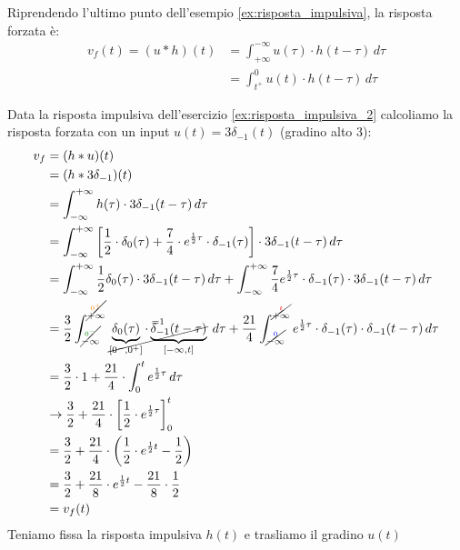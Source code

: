 \documentclass[a4paper]{article}
\begin{document}
\begin{example}
  Riprendendo l'ultimo punto dell'esempio \ref{ex:risposta_impulsiva}, la risposta
  forzata è:
  \[
    \begin{aligned}
      v_f(t) = (u \ast h)(t) &= \int_{+\infty}^{-\infty} u(\tau) \cdot h(t-\tau) \, d\tau\\
                             &= \int_{t^+}^{0} u(t) \cdot h(t-\tau) \, d\tau
    \end{aligned}
  \] 
\end{example}

\begin{exercise}
  \label{ex:risposta_forzata}
  Data la risposta impulsiva dell'esercizio \ref{ex:risposta_impulsiva_2} calcoliamo la
  risposta forzata con un input \( u(t) = 3\delta_{-1}(t) \) (gradino alto 3):
  \[
  \begin{aligned}
    v_f &= (h \ast u)(t) \\
        &= (h \ast 3\delta_{-1})(t)\\
        &= \int_{-\infty}^{+\infty} h(\tau) \cdot 3\delta_{-1}(t-\tau) \, d\tau\\
        &= \int_{-\infty}^{+\infty} \left[ \frac{1}{2} \cdot \delta_0(\tau) + \frac{7}{4}
        \cdot e^{\frac{1}{2}\tau} \cdot \delta_{-1}(\tau) \right] \cdot 3\delta_{-1}(t-\tau) \, d\tau\\
        &= \int_{-\infty}^{+\infty} \frac{1}{2} \delta_0(\tau) \cdot
        3\delta_{-1}(t-\tau) \, d\tau + \int_{-\infty}^{+\infty} \frac{7}{4} e^{\frac{1}{2}\tau}
        \cdot \delta_{-1}(\tau) \cdot 3\delta_{-1}(t-\tau) \, d\tau\\
        &= \frac{3}{2} \int_{\cancel{\stackrel{\color{green!50!black}0^-\color{black}}{-\infty}}}^{\cancel{\stackrel{\color{orange}0^+\color{black}}{+\infty}}} 
        \stackrel{=1}{
        \cancel{
        \underbrace{\delta_0(\tau)}_{[0^-,0^+]} \cdot
        \underbrace{\delta_{-1}(t-\tau)}_{[-\infty,t]}
        }}
        \, d\tau + \frac{21}{4} 
        \int_{\cancel{\stackrel{\color{blue}0\color{black}}{-\infty}}}^{\cancel{\stackrel{\color{red}t\color{black}}{+\infty}}}
        e^{\frac{1}{2}\tau} \cdot \delta_{-1}(\tau) \cdot \delta_{-1}(t-\tau) \, d\tau\\
        &= \frac{3}{2} \cdot 1 + \frac{21}{4} \cdot \int_{0}^{t} e^{\frac{1}{2}\tau} \, d\tau\\
        &\to \frac{3}{2} + \frac{21}{4} \cdot \left[ \frac{1}{2} \cdot e^{\frac{1}{2}\tau} \right]_0^t\\
        &= \frac{3}{2} + \frac{21}{4} \cdot \left( \frac{1}{2} \cdot e^{\frac{1}{2}t} - \frac{1}{2} \right)\\
        &= \frac{3}{2} + \frac{21}{8} \cdot e^{\frac{1}{2}t} - \frac{21}{8} \cdot \frac{1}{2}\\
        &= v_f(t)
  \end{aligned}
  \] 
  Teniamo fissa la risposta impulsiva \( h(t) \) e trasliamo il gradino \( u(t) \)
  \begin{figure}[H]
    \centering
\end{figure}
\end{exercise}
\end{document}
